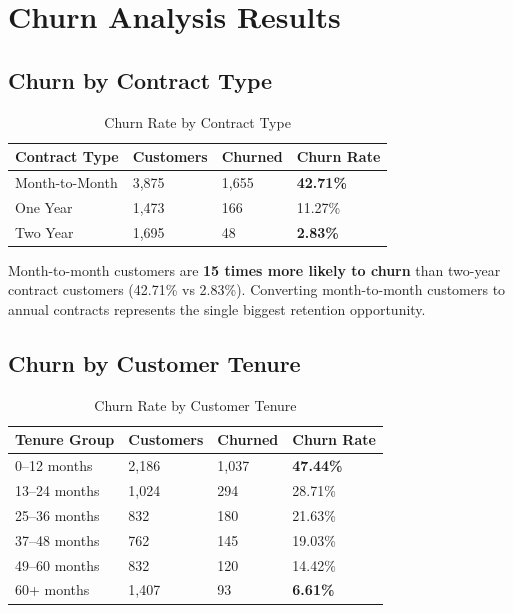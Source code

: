 \documentclass[11pt,a4paper]{article}
\begin{document}
\section{Churn Analysis Results}

\subsection{Churn by Contract Type}

\begin{table}[H]
\centering
\begin{tabular}{p{4cm} p{2.5cm} p{2.5cm} p{2.5cm}}
\toprule
\rowcolor{primary!10}
\textbf{Contract Type} & \textbf{Customers} & \textbf{Churned} & \textbf{Churn Rate} \\
\midrule
\rowcolor{churnred!15}
Month-to-Month & 3,875 & 1,655 & \textcolor{churnred}{\textbf{42.71\%}} \\
One Year & 1,473 & 166 & 11.27\% \\
\rowcolor{retentiongreen!15}
Two Year & 1,695 & 48 & \textcolor{retentiongreen}{\textbf{2.83\%}} \\
\bottomrule
\end{tabular}
\caption{Churn Rate by Contract Type}
\end{table}

\begin{tcolorbox}[
    colback=churnred!5,
    colframe=churnred!60,
    title=\textbf{Key Finding: Contract Type is the \#1 Predictor},
    fonttitle=\bfseries,
    arc=6pt
]
Month-to-month customers are \textbf{15 times more likely to churn} than two-year contract customers (42.71\% vs 2.83\%). Converting month-to-month customers to annual contracts represents the single biggest retention opportunity.
\end{tcolorbox}

\subsection{Churn by Customer Tenure}

\begin{table}[H]
\centering
\begin{tabular}{p{4cm} p{2.5cm} p{2.5cm} p{2.5cm}}
\toprule
\rowcolor{primary!10}
\textbf{Tenure Group} & \textbf{Customers} & \textbf{Churned} & \textbf{Churn Rate} \\
\midrule
\rowcolor{churnred!15}
0--12 months & 2,186 & 1,037 & \textcolor{churnred}{\textbf{47.44\%}} \\
13--24 months & 1,024 & 294 & 28.71\% \\
25--36 months & 832 & 180 & 21.63\% \\
37--48 months & 762 & 145 & 19.03\% \\
49--60 months & 832 & 120 & 14.42\% \\
\rowcolor{retentiongreen!15}
60+ months & 1,407 & 93 & \textcolor{retentiongreen}{\textbf{6.61\%}} \\
\bottomrule
\end{tabular}
\caption{Churn Rate by Customer Tenure}
\end{table}
\end{document}
